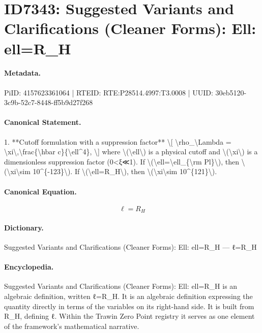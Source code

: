 \section*{ID7343: Suggested Variants and Clarifications (Cleaner Forms): Ell: ell=R\_H}
\paragraph{Metadata.}
PiID: 4157623361064 | RTEID: RTE:P28514.4997:T3.0008 | UUID: 30eb5120-3c9b-52c7-8448-ff5b9d27f268

\paragraph{Canonical Statement.}
1. **Cutoff formulation with a suppression factor** \textbackslash{}[ \textbackslash{}rho\_\textbackslash{}Lambda = \textbackslash{}xi\textbackslash{},\textbackslash{}frac\{\textbackslash{}hbar c\}\{\textbackslash{}ell\textasciicircum{}4\}, \textbackslash{}] where \textbackslash{}(\textbackslash{}ell\textbackslash{}) is a physical cutoff and \textbackslash{}(\textbackslash{}xi\textbackslash{}) is a dimensionless suppression factor (0<ξ≪1). If \textbackslash{}(\textbackslash{}ell=\textbackslash{}ell\_\{\textbackslash{}rm Pl\}\textbackslash{}), then \textbackslash{}(\textbackslash{}xi\textbackslash{}sim 10\textasciicircum{}\{-123\}\textbackslash{}). If \textbackslash{}(\textbackslash{}ell=R\_H\textbackslash{}), then \textbackslash{}(\textbackslash{}xi\textbackslash{}sim 10\textasciicircum{}\{121\}\textbackslash{}).

\paragraph{Canonical Equation.}
\[
\ell=R_H
\]

\paragraph{Dictionary.}
Suggested Variants and Clarifications (Cleaner Forms): Ell: ell=R\_H — ℓ=R\_H

\paragraph{Encyclopedia.}
Suggested Variants and Clarifications (Cleaner Forms): Ell: ell=R\_H is an algebraic definition, written ℓ=R\_H. It is an algebraic definition expressing the quantity directly in terms of the variables on its right-hand side. It is built from R\_H, defining ℓ. Within the Trawin Zero Point registry it serves as one element of the framework's mathematical narrative.
